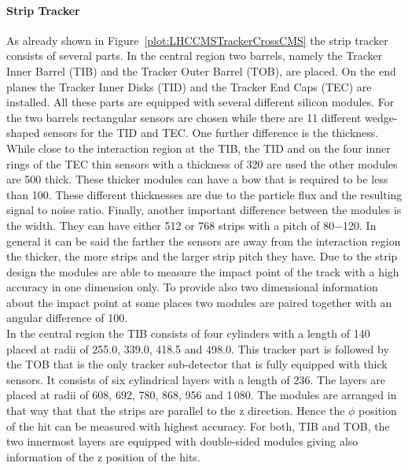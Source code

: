 \paragraph{Strip Tracker}
As already shown in Figure~\ref{plot:LHCCMSTrackerCrossCMS} the strip tracker consists of several parts. In the central region two barrels, namely the Tracker Inner Barrel (TIB) and the Tracker Outer Barrel (TOB), are placed. On the end planes the Tracker Inner Disks (TID) and the Tracker End Caps (TEC) are installed. All these parts are equipped with several different silicon modules. For the two barrels rectangular sensors are chosen while there are 11 different wedge-shaped sensors for the TID and TEC. One further difference is the thickness. While close to the interaction region at the TIB, the TID and on the four inner rings of the TEC thin sensors with a thickness of 320\mum{} are used the other modules are 500\mum{} thick. These thicker modules can have a bow that is required to be less than 100\mum{}. These different thicknesses are due to the particle flux and the resulting signal to noise ratio. Finally, another important difference between the modules is the width. They can have either 512 or 768 strips with a pitch of 80$-$120\mum{}. In general it can be said the farther the sensors are away from the interaction region the thicker, the more strips and the larger strip pitch they have. Due to the strip design the modules are able to measure the impact point of the track with a high accuracy in one dimension only. To provide also two dimensional information about the impact point at some places two modules are paired together with an angular difference of 100\mrad{}.\\
In the central region the TIB consists of four cylinders with a length of 140\cm{} placed at radii of 255.0, 339.0, 418.5 and 498.0\mm{}. This tracker part is followed by the TOB that is the only tracker sub-detector that is fully equipped with thick sensors. It consists of six cylindrical layers with a length of 236\cm{}. The layers are placed at radii of 608, 692, 780, 868, 956 and 1\,080\mm{}. The modules are arranged in that way that that the strips are parallel to the z direction. Hence the $\phi{}$ position of the hit can be measured with highest accuracy. For both, TIB and TOB, the two innermost layers are equipped with double-sided modules giving also information of the z position of the hits.\\
